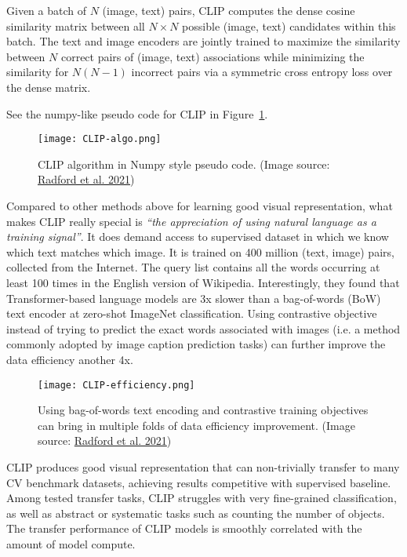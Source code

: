 \documentclass[12pt]{article}
\begin{document}
Given a batch of $N$ (image, text) pairs, CLIP computes the dense cosine similarity matrix between all $N\times N$ possible (image, text) candidates within this batch. The text and image encoders are jointly trained to maximize the similarity between $N$ correct pairs of (image, text) associations while minimizing the similarity for $N(N-1)$ incorrect pairs via a symmetric cross entropy loss over the dense matrix.

See the numpy-like pseudo code for CLIP in Figure~\ref{fig:clip-algo}.

\begin{figure}[H]
    \centering
    \texttt{[image: CLIP-algo.png]}
    \caption{CLIP algorithm in Numpy style pseudo code. (Image source: \href{https://arxiv.org/abs/2103.00020}{Radford et al. 2021})}
    \label{fig:clip-algo}
\end{figure}

Compared to other methods above for learning good visual representation, what makes CLIP really special is \emph{``the appreciation of using natural language as a training signal''}. It does demand access to supervised dataset in which we know which text matches which image. It is trained on 400 million (text, image) pairs, collected from the Internet. The query list contains all the words occurring at least 100 times in the English version of Wikipedia. Interestingly, they found that Transformer-based language models are 3x slower than a bag-of-words (BoW) text encoder at zero-shot ImageNet classification. Using contrastive objective instead of trying to predict the exact words associated with images (i.e. a method commonly adopted by image caption prediction tasks) can further improve the data efficiency another 4x.

\begin{figure}[H]
    \centering
    \texttt{[image: CLIP-efficiency.png]}
    \caption{Using bag-of-words text encoding and contrastive training objectives can bring in multiple folds of data efficiency improvement. (Image source: \href{https://arxiv.org/abs/2103.00020}{Radford et al. 2021})}
\end{figure}

CLIP produces good visual representation that can non-trivially transfer to many CV benchmark datasets, achieving results competitive with supervised baseline. Among tested transfer tasks, CLIP struggles with very fine-grained classification, as well as abstract or systematic tasks such as counting the number of objects. The transfer performance of CLIP models is smoothly correlated with the amount of model compute.
\end{document}
